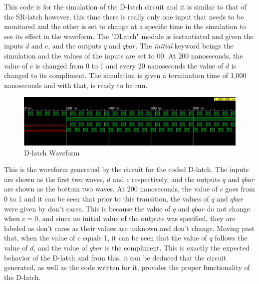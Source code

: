 \documentclass[12pt]{article}
\begin{document}
    \par This code is for the simulation of the D-latch circuit and it is
    similar to that of the SR-latch however, this time there is really only one
    input that needs to be monitored and the other is set to change at a
    specific time in the simulation to see its effect in the waveform. The
    "DLatch" module is instantiated and given the inputs $d$ and $c$, and the
    outputs $q$ and $qbar$. The \textit{initial} keyword beings the simulation
    and the values of the inputs are set to 00. At 200 nanoseconds, the value of
    $c$ is changed from 0 to 1 and every 20 nanoseconds the value of $d$ is
    changed to its compliment. The simulation is given a termination time of
    1,000 nanoseconds and with that, is ready to be run.
    \begin{figure}[h]
        \centering
        \includegraphics[width=1.0\textwidth]{DLatch Waveform.png}
        \caption{D-latch Waveform}
    \end{figure}
    \par This is the waveform generated by the circuit for the coded D-latch.
    The inputs are shown as the first two waves, $d$ and $c$ respectively, and
    the outputs $q$ and $qbar$ are shown as the bottom two waves. At 200
    nanoseconds, the value of $c$ goes from 0 to 1 and it can be seen that prior
    to this transition, the values of $q$ and $qbar$ were given by don't cares.
    This is because the value of $q$ and $qbar$ do not change when $c=0$, and
    since no initial value of the outputs was specified, they are labeled as
    don't cares as their values are unknown and don't change. Moving past that,
    when the value of $c$ equals 1, it can be seen that the value of $q$ follows
    the value of $d$, and the value of $qbar$ is the compliment. This is exactly
    the expected behavior of the D-latch and from this, it can be deduced that
    the circuit generated, as well as the code written for it, provides the
    proper functionality of the D-latch.
\end{document}

